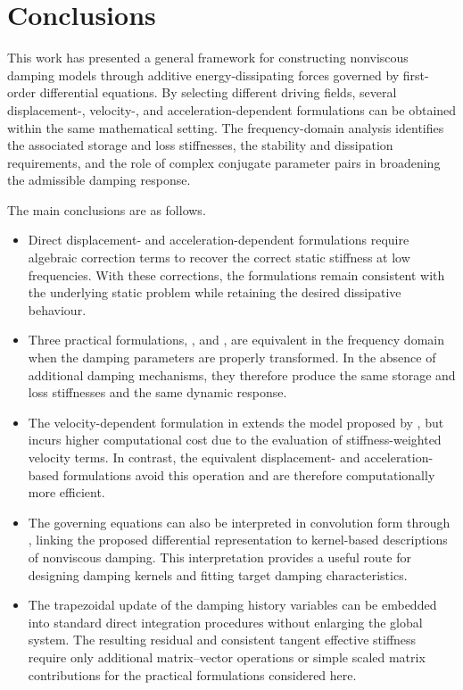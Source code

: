\section{Conclusions}
This work has presented a general framework for constructing nonviscous damping models through additive energy-dissipating forces governed by first-order differential equations. By selecting different driving fields, several displacement-, velocity-, and acceleration-dependent formulations can be obtained within the same mathematical setting. The frequency-domain analysis identifies the associated storage and loss stiffnesses, the stability and dissipation requirements, and the role of complex conjugate parameter pairs in broadening the admissible damping response.

The main conclusions are as follows.
\begin{itemize}
    \item Direct displacement- and acceleration-dependent formulations require algebraic correction terms to recover the correct static stiffness at low frequencies.
With these corrections, the formulations remain consistent with the underlying static problem while retaining the desired dissipative behaviour.
    \item Three practical formulations, ,  and , are equivalent in the frequency domain when the damping parameters are properly transformed.
In the absence of additional damping mechanisms, they therefore produce the same storage and loss stiffnesses and the same dynamic response.
    \item The velocity-dependent formulation in  extends the model proposed by \citet{Huang2019}, but incurs higher computational cost due to the evaluation of stiffness-weighted velocity terms.
In contrast, the equivalent displacement- and acceleration-based formulations avoid this operation and are therefore computationally more efficient.
    \item The governing equations can also be interpreted in convolution form through , linking the proposed differential representation to kernel-based descriptions of nonviscous damping.
This interpretation provides a useful route for designing damping kernels and fitting target damping characteristics.
    \item The trapezoidal update of the damping history variables can be embedded into standard direct integration procedures without enlarging the global system.
The resulting residual and consistent tangent effective stiffness require only additional matrix--vector operations or simple scaled matrix contributions for the practical formulations considered here.
\end{itemize}

